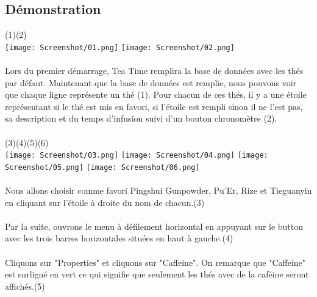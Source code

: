 \documentclass[a4paper,12pt]{article}
\begin{document}
\begin{spacing}{1}
	\section*{Démonstration}
	(1)\space\space\space\space\space\space\space\space\space\space\space\space\space\space\space\space\space\space\space\space\space\space\space\space(2)\\
	\texttt{[image: Screenshot/01.png]}       
	\texttt{[image: Screenshot/02.png]}\\\\      
	Lors du premier démarrage, Tea Time remplira la base de données avec les thés par défaut. 
	Maintenant que la base de données est remplie, nous pouvons voir que chaque ligne représente un thé (1). Pour chacun de ces thés, il y a une étoile représentant si le thé est mis en favori, si l'étoile est rempli sinon il ne l'est pas, sa description et du temps d'infusion suivi d'un bouton chronomètre (2).\\\\
 	(3)\space\space\space\space\space\space\space\space\space\space\space\space\space\space\space\space\space\space\space\space\space\space\space\space\space(4)\space\space\space\space\space\space\space\space\space\space\space\space\space\space\space\space\space\space\space\space\space\space\space\space(5)\space\space\space\space\space\space\space\space\space\space\space\space\space\space\space\space\space\space\space\space\space\space\space\space\space(6)\\
	\texttt{[image: Screenshot/03.png]}    
	\texttt{[image: Screenshot/04.png]}    
	\texttt{[image: Screenshot/05.png]}    
	\texttt{[image: Screenshot/06.png]}\\\\
	Nous allons choisir comme favori Pingshui Gunpowder, Pu'Er, Rize et Tieguanyin en cliquant sur l'étoile à droite du nom de chacun.(3) \\\\
	Par la suite, ouvrons le menu à défilement horizontal en appuyant sur le button avec les trois barres horizontales situées en haut à gauche.(4)\\\\
	Cliquons sur "Properties" et cliquons sur "Caffeine". On remarque que "Caffeine" est surligné en vert ce qui signifie que seulement les thés avec de la caféine seront affichés.(5)\\\\

\end{spacing}
\end{document}
